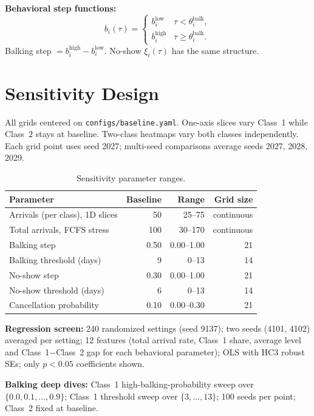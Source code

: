 \documentclass[11pt]{article}
\newcommand{\code}[1]{\texttt{#1}}
\begin{document}
\textbf{Behavioral step functions:}
\[
  b_i(\tau) = \begin{cases}
    b_i^{\text{low}} & \tau < \theta_i^{\text{balk}}, \\
    b_i^{\text{high}} & \tau \geq \theta_i^{\text{balk}}.
  \end{cases}
\]
Balking step $= b_i^{\text{high}} - b_i^{\text{low}}$.
No-show $\xi_i(\tau)$ has the same structure.

\section{Sensitivity Design}
\label{app:sensitivity-design}

All grids centered on \code{configs/baseline.yaml}.
One-axis slices vary Class~1 while Class~2 stays at baseline.
Two-class heatmaps vary both classes independently.
Each grid point uses seed 2027; multi-seed comparisons average
seeds 2027, 2028, 2029.

\begin{table}[H]
\centering
\renewcommand{\arraystretch}{1.15}
\begin{tabular}{p{}rrr}
\toprule
Parameter & Baseline & Range & Grid size \\
\midrule
Arrivals (per class), 1D slices & 50 & 25--75 & continuous \\
Total arrivals, FCFS stress & 100 & 30--170 & continuous \\
Balking step & 0.50 & 0.00--1.00 & 21 \\
Balking threshold (days) & 9 & 0--13 & 14 \\
No-show step & 0.30 & 0.00--1.00 & 21 \\
No-show threshold (days) & 6 & 0--13 & 14 \\
Cancellation probability & 0.10 & 0.00--0.30 & 21 \\
\bottomrule
\end{tabular}
\caption{Sensitivity parameter ranges.}
\end{table}

\textbf{Regression screen:} 240 randomized settings (seed 9137);
two seeds (4101, 4102) averaged per setting; 12 features (total
arrival rate, Class~1 share, average level and Class~1$-$Class~2
gap for each behavioral parameter); OLS with HC3 robust SEs;
only $p < 0.05$ coefficients shown.

\textbf{Balking deep dives:} Class~1 high-balking-probability sweep
over $\{0.0, 0.1, \ldots, 0.9\}$; Class~1 threshold sweep over
$\{3,\ldots,13\}$; 100 seeds per point; Class~2 fixed at baseline.
\end{document}
